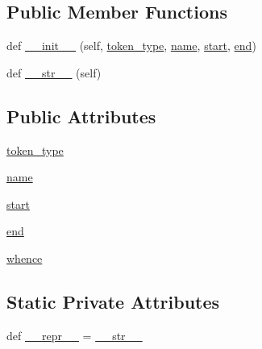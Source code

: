 \subsection*{Public Member Functions}
\begin{DoxyCompactItemize}
\item 
def \hyperlink{classcpp_1_1tokenize_1_1Token_a7da7659a5a6c61d0f4b8590cf96e19fd}{\+\_\+\+\_\+init\+\_\+\+\_\+} (self, \hyperlink{classcpp_1_1tokenize_1_1Token_a60c6e5120f3947885f10788ceb69a660}{token\+\_\+type}, \hyperlink{classcpp_1_1tokenize_1_1Token_a90859dd16bde71bc38f717f5119e63b9}{name}, \hyperlink{classcpp_1_1tokenize_1_1Token_a8ec48e348ff29901857cb21553da464b}{start}, \hyperlink{classcpp_1_1tokenize_1_1Token_a9935738c382352eca19834c2533715db}{end})
\item 
def \hyperlink{classcpp_1_1tokenize_1_1Token_a98e024051039637a18601fcbb0232cc2}{\+\_\+\+\_\+str\+\_\+\+\_\+} (self)
\end{DoxyCompactItemize}
\subsection*{Public Attributes}
\begin{DoxyCompactItemize}
\item 
\hyperlink{classcpp_1_1tokenize_1_1Token_a60c6e5120f3947885f10788ceb69a660}{token\+\_\+type}
\item 
\hyperlink{classcpp_1_1tokenize_1_1Token_a90859dd16bde71bc38f717f5119e63b9}{name}
\item 
\hyperlink{classcpp_1_1tokenize_1_1Token_a8ec48e348ff29901857cb21553da464b}{start}
\item 
\hyperlink{classcpp_1_1tokenize_1_1Token_a9935738c382352eca19834c2533715db}{end}
\item 
\hyperlink{classcpp_1_1tokenize_1_1Token_a9d3a8011707ede6be85987d74f88848d}{whence}
\end{DoxyCompactItemize}
\subsection*{Static Private Attributes}
\begin{DoxyCompactItemize}
\item 
def \hyperlink{classcpp_1_1tokenize_1_1Token_a7bde2890a76f4108d61d10e4de68d715}{\+\_\+\+\_\+repr\+\_\+\+\_\+} = \hyperlink{classcpp_1_1tokenize_1_1Token_a98e024051039637a18601fcbb0232cc2}{\+\_\+\+\_\+str\+\_\+\+\_\+}
\end{DoxyCompactItemize}


